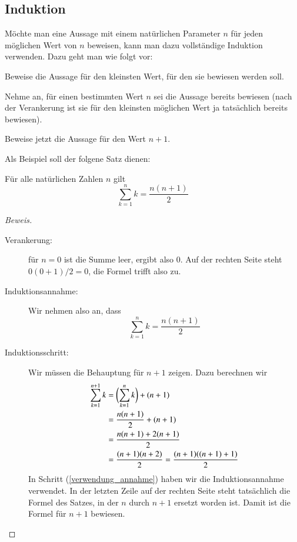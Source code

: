 \subsection{Induktion}
%
%
Möchte man eine Aussage mit einem natürlichen Parameter $n$ für jeden
möglichen Wert von $n$ beweisen, kann man dazu vollständige Induktion
verwenden.
Dazu geht man wie folgt vor:
\begin{description}
%
\item[Verankerung:] Beweise die Aussage für den kleinsten Wert,
für den sie bewiesen werden soll.
%
\item[Induktionsannahme:] Nehme an, für einen bestimmten Wert
$n$ sei die Aussage bereits bewiesen (nach der Verankerung ist sie 
für den kleinsten möglichen Wert ja tatsächlich bereits bewiesen).
%
\item[Induktionsschritt:] Beweise jetzt die Aussage für den Wert $n+1$.
\end{description}

Als Beispiel soll der folgene Satz dienen:

\begin{satz} Für alle natürlichen Zahlen $n$ gilt
\[
\sum_{k=1}^nk=\frac{n(n+1)}2
\]
\end{satz}
\begin{proof}[Beweis]
\begin{description}
\item[Verankerung:] für $n=0$ ist die Summe leer, ergibt also $0$.
Auf der rechten Seite steht $0(0+1)/2=0$, die Formel trifft also zu.
\item[Induktionsannahme:]Wir nehmen also an, dass
\[
\sum_{k=1}^nk=\frac{n(n+1)}2
\]
\item[Induktionsschritt:] Wir müssen die Behauptung für $n+1$ zeigen.
Dazu berechnen wir
\begin{align}
\sum_{k=1}^{n+1}k&=\biggl(\sum_{k=1}^nk\biggr) + (n+1)\notag\\
&=\frac{n(n+1)}2+(n+1)\label{verwendung_annahme}\\
&=\frac{n(n+1)+2(n+1)}2\notag\\
&=\frac{(n+1)(n+2)}2=\frac{(n+1)((n+1)+1)}2\notag
\end{align}
In Schritt (\ref{verwendung_annahme}) haben wir die Induktionsannahme
verwendet.
In der letzten Zeile auf der rechten Seite steht tatsächlich
die Formel des Satzes, in der $n$ durch $n+1$ ersetzt worden ist.
Damit ist die Formel für $n+1$ bewiesen.
\end{description}
\end{proof}

